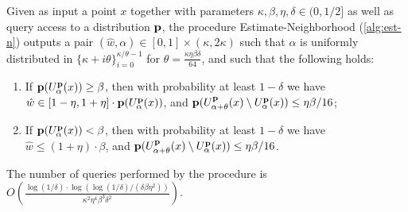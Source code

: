 \begin{lemma}\label{lem:est-n}
Given as input a point $x$ together with parameters
$\kappa,\beta,\eta,\delta\in (0,1/2]$ as well as
\PCOND query access to a distribution $\mathbf{p}$,
the procedure {\sc Estimate-Neighborhood} (\cref{alg:est-n})
outputs a pair $(\hat{w},\alpha) \in [0,1]\times (\kappa,2\kappa)$
such that $\alpha$ is uniformly distributed in
$\{\kappa+i\theta\}_{i=0}^{\kappa/\theta -1}$
for $\theta = \frac{\kappa\eta\beta\delta}{64}$, and
such that the following holds:
\begin{enumerate}
\item If $\mathbf{p}(U^{\mathbf{p}}_\alpha(x)) \geq \beta$,
then with probability at least \mbox{$1-\delta$} we have
$\hat{w} \in [1-\eta,1+\eta]\cdot\mathbf{p}(U^{\mathbf{p}}_\alpha(x))$,
and \mbox{$\mathbf{p}(U^{\mathbf{p}}_{\alpha+\theta}(x)\setminus U^{\mathbf{p}}_\alpha(x))
    \leq \eta\beta/16$};
\item If $\mathbf{p}(U^{\mathbf{p}}_\alpha(x)) < \beta$,
then with probability at least $1-\delta$ we have
$\hat{w}\leq (1+\eta)\cdot\beta$,
and $\mathbf{p}(U^{\mathbf{p}}_{\alpha+\theta}(x)\setminus U^{\mathbf{p}}_\alpha(x))
    \leq \eta\beta/16$.
\end{enumerate}
The number of \PCOND queries performed by the procedure is
$O\!\left(\frac{\log(1/\delta) \cdot \log(\log(1/\delta)/(\delta\beta\eta^2))}
            {\kappa^2\eta^4\beta^3\delta^2}\right)$.
\end{lemma}

